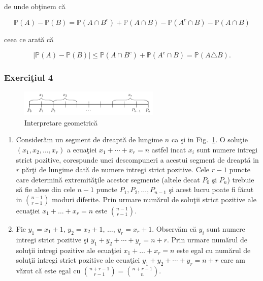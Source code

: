 \documentclass[]{article}
\def\PP{{\mathbb P}}
\begin{document}
de unde ob\c tinem c\u a

\[
  \PP(A)-\PP(B) = \PP(A\cap B^c)+\PP(A\cap B)-\PP(A^c\cap B)-\PP(A\cap B)
\]

ceea ce arat\u a c\u a

\[
  |\PP(A)-\PP(B)|\leq \PP(A\cap B^c)+\PP(A^c\cap B)=\PP(A\triangle B).
\]

\subsubsection{\texorpdfstring{Exerci\c tiul
4}{Exerciiul 4}}\label{exerciiul-4}

\begin{figure}[ht]
         \centerline{
          \includegraphics[width=0.6\textwidth]{Figs/fig_T1_ex4.pdf}}
          \caption{Interpretare geometric\u a}
          \label{fig_T1_ex4}
\end{figure}

\begin{enumerate}
\item Consider\u am un segment de dreapt\u a de lungime $n$ ca \c si in Fig.~\ref{fig_T1_ex4}. O solu\c tie $(x_1,x_2,\dots,x_r)$ a ecua\c tiei $x_1+\cdots+x_r=n$ astfel incat $x_i$ sunt numere intregi strict pozitive, corespunde unei descompuneri a acestui segment de dreapt\u a in $r$ p\u ar\c ti de lungime dat\u a de numere intregi strict pozitive. Cele $r-1$ puncte care determin\u a extremit\u a\c tile acestor segmente (altele decat $P_0$ \c si $P_n$) trebuie s\u a fie alese din cele $n-1$ puncte $P_1,P_2,\dots,P_{n-1}$ \c si acest lucru poate fi f\u acut in $\binom{n-1}{r-1}$ moduri diferite. Prin urmare num\u arul de solu\c tii strict pozitive ale ecua\c tiei $x_{1} + \ldots + x_{r} = n$ este $\binom{n-1}{r-1}$.

\item Fie $y_1=x_1+1$, $y_2=x_2+1$, $\dots$, $y_r=x_r+1$. Observ\u am c\u a $y_i$ sunt numere intregi strict pozitive \c si $y_1+y_2+\cdots+y_r=n+r$. Prin urmare num\u arul de solu\c tii intregi pozitive ale ecua\c tiei $x_{1} + \ldots + x_{r} = n$ este egal cu num\u arul de solu\c tii intregi strict pozitive ale ecua\c tiei $y_1+y_2+\cdots+y_r=n+r$ care am v\u azut c\u a este egal cu $\binom{n+r-1}{r-1}=\binom{n+r-1}{n}$.
\end{enumerate}
\end{document}
